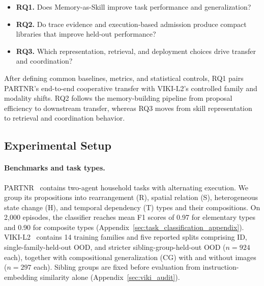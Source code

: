 \documentclass{article}
\theoremstyle{plain}
\theoremstyle{definition}
\theoremstyle{remark}
\begin{document}
\begin{itemize}[leftmargin=1.5em, itemsep=0.2em, topsep=0.2em, parsep=0pt]
    \item \textbf{RQ1.} Does Memory-as-Skill improve task performance and generalization?
    \item \textbf{RQ2.} Do trace evidence and execution-based admission produce compact libraries that improve held-out performance?
    \item \textbf{RQ3.} Which representation, retrieval, and deployment choices drive transfer and coordination?
\end{itemize}

After defining common baselines, metrics, and statistical controls, RQ1 pairs PARTNR's end-to-end cooperative transfer with VIKI-L2's controlled family and modality shifts. RQ2 follows the memory-building pipeline from proposal efficiency to downstream transfer, whereas RQ3 moves from skill representation to retrieval and coordination behavior.
 
 
 
 
\subsection{Experimental Setup}
\label{subsec:setup}
 
\paragraph{Benchmarks and task types.}
PARTNR~\citep{PARTNR} contains two-agent household tasks with alternating execution. We group its propositions into rearrangement (R), spatial relation (S), heterogeneous state change (H), and temporal dependency (T) types and their compositions. On 2{,}000 episodes, the classifier reaches mean F1 scores of 0.97 for elementary types and 0.90 for composite types (Appendix~\ref{sec:task_classification_appendix}). VIKI-L2~\citep{kang2025viki} contains 14 training families and five reported splits comprising ID, single-family-held-out OOD, and stricter sibling-group-held-out OOD ($n=924$ each), together with compositional generalization (CG) with and without images ($n=297$ each). Sibling groups are fixed before evaluation from instruction-embedding similarity alone (Appendix~\ref{sec:viki_audit}).
\end{document}
